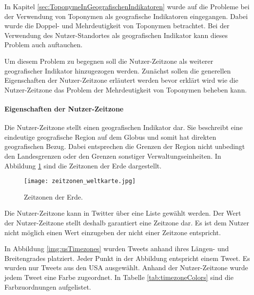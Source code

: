 				In Kapitel \ref{sec:ToponymeInGeografischenIndikatoren} wurde auf die Probleme bei der Verwendung von Toponymen als geografische Indikatoren eingegangen.
				Dabei wurde die Doppel- und Mehrdeutigkeit von Toponymen betrachtet.
				Bei der Verwendung des Nutzer-Standortes als geografischen Indikator kann dieses Problem auch auftauchen. 

				Um diesem Problem zu begegnen soll die Nutzer-Zeitzone als weiterer geografischer Indikator hinzugezogen werden.
				Zunächst sollen die generellen Eigenschaften der Nutzer-Zeitzone erläutert werden bevor erklärt wird wie die Nutzer-Zeitzone das Problem der Mehrdeutigkeit von Toponymen beheben kann.

				\paragraph{Eigenschaften der Nutzer-Zeitzone}

					Die Nutzer-Zeitzone stellt einen geografischen Indikator dar.
					Sie beschreibt eine eindeutige geografische Region auf dem Globus und somit hat direkten geografischen Bezug.
					Dabei entsprechen die Grenzen der Region nicht unbedingt den Landesgrenzen oder den Grenzen sonstiger Verwaltungseinheiten. 
					In Abbildung \ref{img:timezones} sind die Zeitzonen der Erde dargestellt.

					\begin{figure}[!ht]
						\begin{center}
							\texttt{[image: zeitzonen\_weltkarte.jpg]}
							\caption{Zeitzonen der Erde.}
							\label{img:timezones}
						\end{center}
					\end{figure}	

					Die Nutzer-Zeitzone kann in Twitter über eine Liste gewählt werden.
					Der Wert der Nutzer-Zeitzone stellt deshalb garantiert eine Zeitzone dar.
					Es ist dem Nutzer nicht möglich einen Wert einzugeben der nicht einer Zeitzone entspricht.

					In Abbildung \ref{img:usTimezones} wurden Tweets anhand ihres Längen- und Breitengrades platziert.
					Jeder Punkt in der Abbildung entspricht einem Tweet.
					Es wurden nur Tweets aus den USA ausgewählt.
					Anhand der Nutzer-Zeitzone wurde jedem Tweet eine Farbe zugeordnet.
					In Tabelle \ref{tab:timezoneColors} sind die Farbzuordnungen aufgelistet. 

